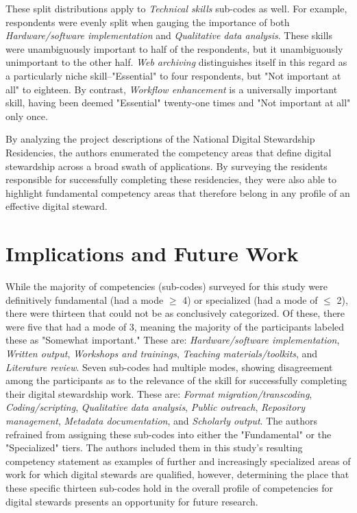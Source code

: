 \documentclass{acm_proc_article-sp}
\begin{document}
These split distributions apply to \textit{Technical skills} sub-codes as well. For example, respondents were evenly split when gauging the importance of both \textit{Hardware/software implementation} and \textit{Qualitative data analysis}. These skills were unambiguously important to half of the respondents, but it unambiguously unimportant to the other half. \textit{Web archiving} distinguishes itself in this regard as a particularly niche skill--"Essential" to four respondents, but "Not important at all" to eighteen. By contrast, \textit{Workflow enhancement} is a universally important skill, having been deemed "Essential" twenty-one times and "Not important at all" only once.   

By analyzing the project descriptions of the National Digital Stewardship Residencies, the authors enumerated the competency areas that define digital stewardship across a broad swath of applications. By surveying the residents responsible for successfully completing these residencies, they were also able to highlight fundamental competency areas that therefore belong in any profile of an effective digital steward.

\section{Implications and Future Work}
While the majority of competencies (sub-codes) surveyed for this study were definitively fundamental (had a mode $\geq$ 4) or specialized (had a mode of $\leq$ 2), there were thirteen that could not be as conclusively categorized. Of these, there were five that had a mode of 3, meaning the majority of the participants labeled these as "Somewhat important." These are: \textit{Hardware/software implementation}, \textit{Written output}, \textit{Workshops and trainings}, \textit{Teaching materials/toolkits}, and \textit{Literature review}. Seven sub-codes had multiple modes, showing disagreement among the participants as to the relevance of the skill for successfully completing their digital stewardship work. These are: \textit{Format migration/transcoding}, \textit{Coding/scripting}, \textit{Qualitative data analysis}, \textit{Public outreach}, \textit{Repository management}, \textit{Metadata documentation}, and \textit{Scholarly output}. The authors refrained from assigning these sub-codes into either the "Fundamental" or the "Specialized" tiers. The authors included them in this study's resulting competency statement as examples of further and increasingly specialized areas of work for which digital stewards are qualified, however, determining the place that these specific thirteen sub-codes hold in the overall profile of competencies for digital stewards presents an opportunity for future research.
\end{document}
